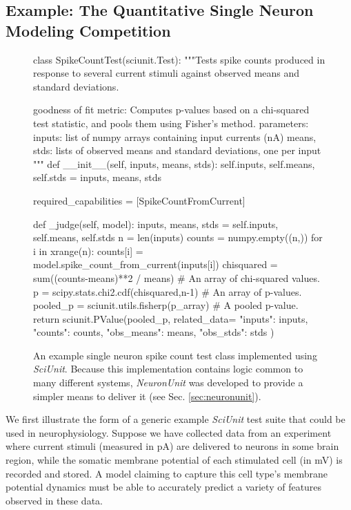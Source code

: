 \documentclass[9pt]{sig-alternate}
\begin{document}
\subsection{Example: The Quantitative Single Neuron Modeling Competition}
\begin{figure}[t]
\small
\begin{python}
class SpikeCountTest(sciunit.Test):
  """Tests spike counts produced in response to several current stimuli against observed means and standard deviations. 

  goodness of fit metric: Computes p-values based on a chi-squared test statistic, and pools them using Fisher's method.
  parameters:
    inputs: list of numpy arrays containing input currents (nA)
    means, stds: lists of observed means and standard deviations, one per input
  """
  def __init__(self, inputs, means, stds):
    self.inputs, self.means, self.stds = inputs, means, stds
	
  required_capabilities = [SpikeCountFromCurrent]
	
  def _judge(self, model):
    inputs, means, stds = self.inputs, self.means, self.stds
    n = len(inputs)
    counts = numpy.empty((n,))
    for i in xrange(n):
      counts[i] = model.spike_count_from_current(inputs[i])
    chisquared = sum((counts-means)**2 / means) # An array of chi-squared values.  
    p = scipy.stats.chi2.cdf(chisquared,n-1) # An array of p-values.  
    pooled_p = sciunit.utils.fisherp(p_array) # A pooled p-value.  
    return sciunit.PValue(pooled_p, related_data={
      "inputs": inputs, "counts": counts, "obs_means": means, "obs_stds": stds
    })
\end{python}
\vspace{-5px}
\caption{An example single neuron spike count test class implemented using \textit{SciUnit}. Because this implementation contains logic common to many different systems, \textit{NeuronUnit} was developed to provide a simpler means to deliver it (see Sec. \ref{sec:neuronunit}).}
\label{fig:rate_test}
\vspace{-15px}
\end{figure}

We first illustrate the form of a generic example \textit{SciUnit} test suite that could be used in neurophysiology. 
Suppose we have collected data from an experiment where current stimuli (measured in pA) are delivered to neurons in some brain region, while the somatic membrane potential of each stimulated cell (in mV) is recorded and stored.  
A model claiming to capture this cell type's membrane potential dynamics must be able to accurately predict a variety of features observed in these data.
\end{document}
